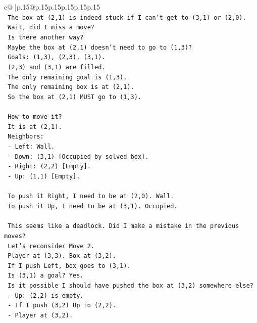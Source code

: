 \documentclass{article}
\begin{document}
{\begin{supertabular}{c@{$\;$}|p{.15\linewidth}@{}p{.15\linewidth}p{.15\linewidth}p{.15\linewidth}p{.15\linewidth}p{.15\linewidth}}
{{{\\ 
\texttt{    The box at (2,1) is indeed stuck if I can't get to (3,1) or (2,0).} \\
\texttt{    Wait, did I miss a move?} \\
\texttt{    Is there another way?} \\
\texttt{    Maybe the box at (2,1) doesn't need to go to (1,3)?} \\
\texttt{    Goals: (1,3), (2,3), (3,1).} \\
\texttt{    (2,3) and (3,1) are filled.} \\
\texttt{    The only remaining goal is (1,3).} \\
\texttt{    The only remaining box is at (2,1).} \\
\texttt{    So the box at (2,1) MUST go to (1,3).} \\
\\ 
\texttt{    How to move it?} \\
\texttt{    It is at (2,1).} \\
\texttt{    Neighbors:} \\
\texttt{    {-} Left: Wall.} \\
\texttt{    {-} Down: (3,1) {[}Occupied by solved box{]}.} \\
\texttt{    {-} Right: (2,2) {[}Empty{]}.} \\
\texttt{    {-} Up: (1,1) {[}Empty{]}.} \\
\\ 
\texttt{    To push it Right, I need to be at (2,0). Wall.} \\
\texttt{    To push it Up, I need to be at (3,1). Occupied.} \\
\\ 
\texttt{    This seems like a deadlock. Did I make a mistake in the previous moves?} \\
\texttt{    Let's reconsider Move 2.} \\
\texttt{    Player at (3,3). Box at (3,2).} \\
\texttt{    If I push Left, box goes to (3,1).} \\
\texttt{    Is (3,1) a goal? Yes.} \\
\texttt{    Is it possible I should have pushed the box at (3,2) somewhere else?} \\
\texttt{    {-} Up: (2,2) is empty.} \\
\texttt{      {-} If I push (3,2) Up to (2,2).} \\
\texttt{      {-} Player at (3,2).} \\
}}}
\end{supertabular}}
\end{document}
